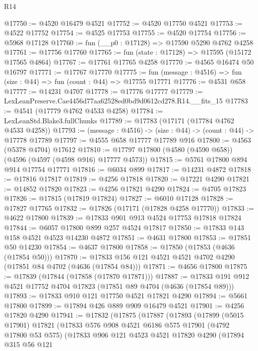 \begin{lexlean}{R14}
\begin{coremodule}
@17750 := @4520 @16479 @4521
@17752 := @4520 @17750 @4521
@17753 := @4522 @17752
@17754 := @4525 @17753
@17755 := @4520 @17754
@17756 := @5968 @17128
@17760 := fun (__p0 : @17128) => @17590 @5290 @4762 @4258
@17761 := @17756 @17760
@17765 := fun (state : @17128) => @17595 (@15172 @17565 @4864)
@17767 := @17761 @17765 @4258
@17770 := @4565 @16474 @50 @16797
@17771 := @17767 @17770
@17775 := fun (message : @4516) => fun (size : @44) => fun (count : @44) => @17755 @17771
@17776 := @4531 @658
@17777 := @14231 @4707
@17778 := @17776 @17777
@17779 := LexLeanPreserve.Cae4456d77aa62528ed0bd9d0612cd278.R14.__fits_15
@17783 := @4541 (@17779 @4762 @4533 @4258)
@17784 := LexLeanStd.Blake3.fullChunks
@17789 := @17783 (@17171 (@17784 @4762 @4533 @4258))
@17793 := (message : @4516) -> (size : @44) -> (count : @44) -> @17778 @17789
@17797 := @4555 @658 @17777 @17789 @916
@17800 := @4563 (@5378 @4704) @17612
@17810 := @17797 @17800 (@4580 (@4590 @658)) (@4596 (@4597 (@4598 @916) @17777 @4573))
@17815 := @5761 @17800 @894 @914 @17754 @17771
@17816 := @6034 @899
@17817 := @14231 @4872
@17818 := @17816 @17817
@17819 := @4256 @17818
@17820 := @17221 @4290
@17821 := @14852 @17820
@17823 := @4256 @17821 @4290
@17824 := @4705 @17823
@17826 := @17815 (@17819 @17824)
@17827 := @6010 @17128
@17828 := @17827 @17765
@17832 := @17826 (@17171 (@17828 @4258 @17770))
@17833 := @4622 @17800
@17839 := @17833 @901 @913 @4524 @17753 @17818 @17824
@17844 := @6057 @17800 @899 @257 @4524 @17817
@17850 := @17833 @143 @158 @4521 @4523 @14230 @4872
@17851 := @4631 @17800
@17853 := @17851 @50 @14230
@17854 := @4637 @17800
@17858 := @17850 (@17853 (@4636 (@17854 @50)))
@17870 := @17833 @156 @121 @4521 @4521 @4702 @4290 (@17851 @84 @4702 (@4636 (@17854 @84)))
@17871 := @4656 @17800
@17875 := @17839 (@17844 (@17858 (@17870 @17871)))
@17887 := @17833 @191 @912 @4521 @17752 @4704 @17823 (@17851 @89 @4704 (@4636 (@17854 @89)))
@17893 := @17833 @910 @121 @17750 @4521 @17821 @4290
@17894 := @5661 @17800
@17899 := @17894 @426 @889 @909 @16479 @4521
@17901 := @4256 @17820 @4290
@17941 := @17832
    (@17875
      (@17887
        (@17893
          (@17899
            (@5015 @17901)
            @17821
            (@17833
              @576
              @908
              @4521
              @6186
              @575
              @17901
              (@4792 @17800 @53 @575)
              (@17833
                @906
                @121
                @4523
                @4521
                @17820
                @4290
                (@17894
                  @315
                  @56
                  @121

\end{coremodule}
\end{lexlean}
